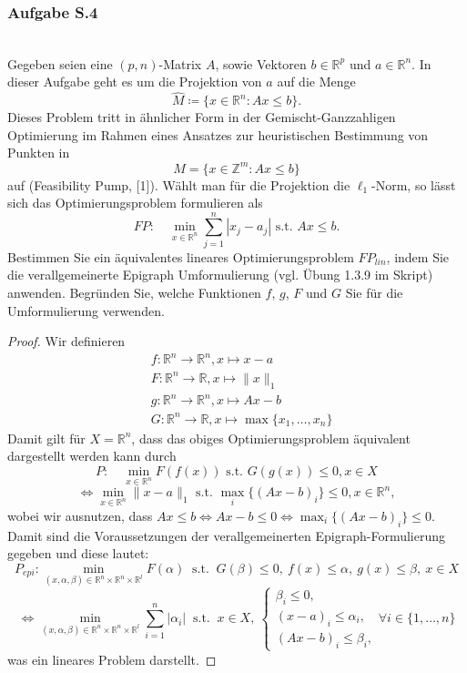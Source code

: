 \documentclass[12pt]{extreport} %
\newcommand{\R}{\mathbb{R}}
\newcommand{\Z}{\mathbb{Z}}
\theoremstyle{named}
\theoremstyle{nnamed}
\theoremstyle{itshape}
\theoremstyle{normal}
\begin{document}
\newpage

\subsubsection{Aufgabe S.4} ~\\

Gegeben seien eine $(p, n)$-Matrix $A$, sowie Vektoren $b \in \R^p$ und $a \in \R^n$. In dieser Aufgabe geht es um die Projektion von $a$ auf die Menge
$$ \hat{M} \coloneqq \big\{ x \in \R^n \colon A x \leq b \big\}. $$
Dieses Problem tritt in ähnlicher Form in der Gemischt-Ganzzahligen Optimierung im Rahmen
eines Ansatzes zur heuristischen Bestimmung von Punkten in
$$ M = \big\{ x \in \Z^m \colon Ax \leq b \big\} $$
auf (Feasibility Pump, [1]). Wählt man für die Projektion die $\ell_1$-Norm, so lässt sich das
Optimierungsproblem formulieren als
$$ FP \colon \quad \min_{x \in \R^n} \sum_{j=1}^{n} \left| x_j - a_j \right| \text{ s.t. } Ax \leq b. $$
Bestimmen Sie ein äquivalentes lineares Optimierungsproblem $FP_{lin}$, indem Sie die verallgemeinerte Epigraph Umformulierung (vgl. Übung 1.3.9 im Skript) anwenden. Begründen Sie, welche Funktionen $f$, $g$, $F$ und $G$ Sie für die Umformulierung verwenden.
\begin{proof}
	Wir definieren
	\begin{align*}
		& f \colon \R^n \rightarrow \R^n, x \mapsto x - a \\
		& F \colon \R^n \rightarrow \R, x \mapsto \| x \|_1 \\
		& g \colon \R^n \rightarrow \R^n, x \mapsto Ax - b \\
		& G \colon \R^n \rightarrow \R, x \mapsto \max \{ x_1, \dotsc, x_n \}	
	\end{align*}
	Damit gilt für $X = \R^n$, dass das obiges Optimierungsproblem äquivalent dargestellt werden kann durch
	$$ P: \quad \min_{x \in \R^n} F(f(x)) \text{ s.t. } G(g(x)) \leq 0, x \in X $$
	$$ \iff \min_{x \in \R^n} \| x - a \|_1 \text{ s.t. } \max_i \{ (Ax - b)_i \} \leq 0, x \in \R^n, $$
	wobei wir ausnutzen, dass $Ax \leq b \iff Ax -b \leq 0 \iff  \max_i \{ (Ax - b)_i \} \leq 0$. Damit sind die Voraussetzungen der verallgemeinerten Epigraph-Formulierung gegeben und diese lautet:
	$$ P_{epi}: \min_{(x, \alpha, \beta) \in \R^n \times \R^n \times \R^l} F(\alpha) ~ \text{ s.t. } ~  G(\beta) \leq 0, ~ f(x) \leq \alpha, ~ g(x) \leq \beta, ~ x \in X $$ 
	$$ \iff \min_{(x, \alpha, \beta) \in \R^n \times \R^n \times \R^l} \sum_{i=1}^n |\alpha_i| ~ \text{ s.t. } ~ x \in X,~ \begin{cases} \beta_i \leq 0, \\ (x - a)_i \leq \alpha_i, \\ (Ax - b)_i \leq \beta_i, \end{cases} \forall i \in \{1, \dotsc, n \} $$
	was ein lineares Problem darstellt.
\end{proof}
\end{document}
